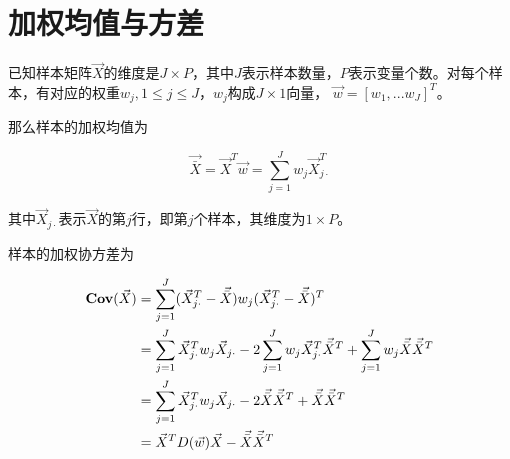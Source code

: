 \section{加权均值与方差}

已知样本矩阵$\vec{X}$的维度是$J\times P$，其中$J$表示样本数量，$P$表示变量个数。对每个样本，有对应的权重$w_j, 1\leq j\leq J$，$w_j$构成$J\times 1$向量， $\vec{w} = [w_1,...w_J]^T$。

那么样本的加权均值为

\begin{equation}
    \vec{\bar{X}} = \vec{X}^T\vec{w} = \sum_{j=1}^Jw_j\vec{X}^T_{j\cdot}
\end{equation}

其中$\vec{X}_{j\cdot}$表示$\vec{X}$的第$j$行，即第$j$个样本，其维度为$1\times P$。

样本的加权协方差为

\begin{equation}
    \begin{aligned}
        \mathbf{Cov}(\vec{X}) & = \sum_{j=1}^J(\vec{X}^T_{j\cdot} - \vec{\bar{X}})w_j(\vec{X}^T_{j\cdot} - \vec{\bar{X}})^T                                                           \\
                      & = \sum_{j=1}^J\vec{X}^T_{j\cdot}w_j\vec{X}_{j\cdot} - 2\sum_{j=1}^Jw_j\vec{X}^T_{j\cdot}\vec{\bar{X}}^T + \sum_{j=1}^Jw_j\vec{\bar{X}}\vec{\bar{X}}^T \\
                      & = \sum_{j=1}^J\vec{X}^T_{j\cdot}w_j\vec{X}_{j\cdot} -2\vec{\bar{X}}\vec{\bar{X}}^T + \vec{\bar{X}}\vec{\bar{X}}^T \\
                      & = \vec{X}^TD(\vec{w})\vec{X} - \vec{\bar{X}}\vec{\bar{X}}^T
    \end{aligned}
\end{equation}
